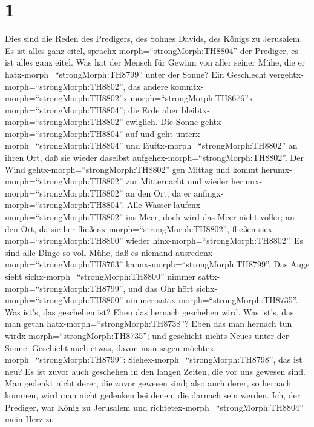 \hypertarget{section}{%
\section{1}\label{section}}

 Dies sind die Reden des Predigers, des Sohnes Davids, des
Königs zu Jerusalem.  Es ist alles ganz eitel,
sprachx-morph=``strongMorph:TH8804'' der Prediger, es ist alles ganz
eitel.  Was hat der Mensch für Gewinn von aller seiner Mühe,
die er hatx-morph=``strongMorph:TH8799'' unter der Sonne? 
Ein Geschlecht vergehtx-morph=``strongMorph:TH8802'', das andere
kommtx-morph=``strongMorph:TH8802''\textbar x-morph=``strongMorph:TH8676''x-morph=``strongMorph:TH8804'';
die Erde aber bleibtx-morph=``strongMorph:TH8802'' ewiglich.
 Die Sonne gehtx-morph=``strongMorph:TH8804'' auf und geht
unterx-morph=``strongMorph:TH8804'' und
läuftx-morph=``strongMorph:TH8802'' an ihren Ort, daß sie wieder
daselbst aufgehex-morph=``strongMorph:TH8802''.  Der Wind
gehtx-morph=``strongMorph:TH8802'' gen Mittag und kommt
herumx-morph=``strongMorph:TH8802'' zur Mitternacht und wieder
herumx-morph=``strongMorph:TH8802'' an den Ort, da er
anfingx-morph=``strongMorph:TH8804''.  Alle Wasser
laufenx-morph=``strongMorph:TH8802'' ins Meer, doch wird das Meer nicht
voller; an den Ort, da sie her fließenx-morph=``strongMorph:TH8802'',
fließen siex-morph=``strongMorph:TH8800'' wieder
hinx-morph=``strongMorph:TH8802''.  Es sind alle Dinge so
voll Mühe, daß es niemand ausredenx-morph=``strongMorph:TH8763''
kannx-morph=``strongMorph:TH8799''. Das Auge sieht
sichx-morph=``strongMorph:TH8800'' nimmer
sattx-morph=``strongMorph:TH8799'', und das Ohr hört
sichx-morph=``strongMorph:TH8800'' nimmer
sattx-morph=``strongMorph:TH8735''.  Was ist's, das
geschehen ist? Eben das hernach geschehen wird. Was ist's, das man getan
hatx-morph=``strongMorph:TH8738''? Eben das man hernach tun
wirdx-morph=``strongMorph:TH8735''; und geschieht nichts Neues unter der
Sonne.  Geschieht auch etwas, davon man sagen
möchtex-morph=``strongMorph:TH8799'':
Siehex-morph=``strongMorph:TH8798'', das ist neu? Es ist zuvor auch
geschehen in den langen Zeiten, die vor uns gewesen sind. 
Man gedenkt nicht derer, die zuvor gewesen sind; also auch derer, so
hernach kommen, wird man nicht gedenken bei denen, die darnach sein
werden.  Ich, der Prediger, war König zu Jerusalem
 und richtetex-morph=``strongMorph:TH8804'' mein Herz zu
